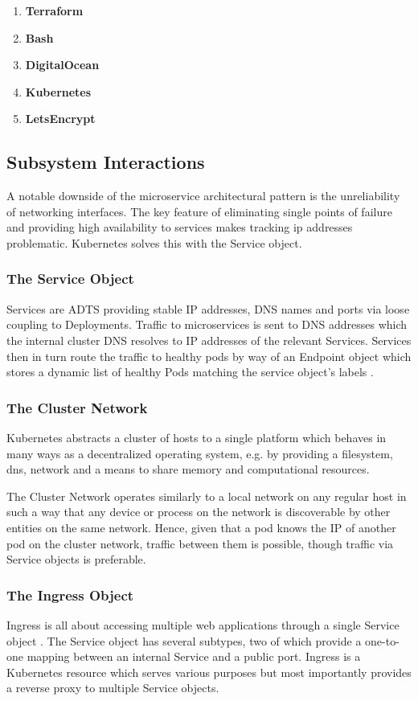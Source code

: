 \begin{enumerate}
    \item \textbf{Terraform}
    \item \textbf{Bash}
    \item \textbf{DigitalOcean}
    \item \textbf{Kubernetes}
    \item \textbf{LetsEncrypt}
\end{enumerate}


\subsection{Subsystem Interactions}
\label{subsec:subsystem_interactions}
A notable downside of the microservice architectural pattern is the unreliability of networking interfaces. 
The key feature of eliminating single points of failure and providing high availability to services makes tracking ip addresses problematic.
Kubernetes solves this with the Service object.
\subsubsection{The Service Object}
Services are ADTS providing stable IP addresses, DNS names and ports via loose coupling to Deployments.
Traffic to microservices is sent to DNS addresses which the internal cluster DNS resolves to IP addresses of the relevant Services.
Services then in turn route the traffic to healthy pods by way of an Endpoint object which stores a dynamic list of healthy Pods matching the service object's labels \cite{k8sbook}.

\subsubsection{The Cluster Network}
Kubernetes abstracts a cluster of hosts to a single platform which behaves in many ways as a decentralized operating system, e.g. by providing a filesystem, dns, network and a means to share memory and computational resources. \par
The Cluster Network operates similarly to a local network on any regular host in such a way that any device or process on the network is discoverable by other entities on the same network. 
Hence, given that a pod knows the IP of another pod on the cluster network, traffic between them is possible, though traffic via Service objects is preferable.
\subsubsection{The Ingress Object}
Ingress is all about accessing multiple web applications through a single Service object \cite{k8sbook}. 
The Service object has several subtypes, two of which provide a one-to-one mapping between an internal Service and a public port.
Ingress is a Kubernetes resource which serves various purposes but most importantly provides a reverse proxy to multiple Service objects.
